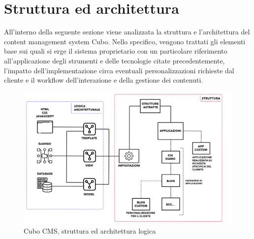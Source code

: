 \section{Struttura ed architettura} 
All'interno della seguente sezione viene analizzata la struttura e l'architettura del content management system Cubo. 
Nello specifico, vengono trattati gli elementi base sui quali si erge il sistema proprietario con un particolare riferimento all'applicazione degli strumenti e delle tecnologie citate precedentemente, l'impatto dell'implementazione circa eventuali personalizzazioni richieste dal cliente e il workflow dell'interazione e della gestione dei contenuti.

\begin{figure}[ht!]
    \centering
    \includegraphics[width=155mm]{images/Cubo CMS Struttura.png}
    \caption{Cubo CMS, struttura ed architettura logica \label{overflow}}
\end{figure}
\clearpage
